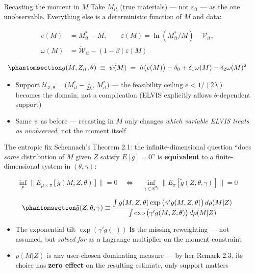 \documentclass[
  ignorenonframetext,
  aspectratio=169,
]{beamer}
\providecommand{\tightlist}{%
  \setlength{\itemsep}{0pt}\setlength{\parskip}{0pt}}
\begin{document}
\begin{frame}{Recasting the moment in \(M\)}
\protect{}\label{recasting-the-moment-in-m}
Take \(M_{it}\) (true materials) --- not \(\varepsilon_{it}\) --- as the
one unobservable. Everything else is a deterministic function of \(M\)
and data:

\[
\begin{aligned}
e(M)&=M^*_{it}-M,\qquad \varepsilon(M)=\ln(M^*_{it}/M)-\mathcal V_{it},\\
\omega(M)&=\tilde{\mathcal W}_{it}-(1-\beta)\varepsilon(M)
\end{aligned}
\]

\begin{equation}\protect\phantomsection\label{eq-elvis-g}{
g(M,Z_{it},\theta)\;\equiv\;\psi(M)\;=\;h\big(e(M)\big)-\delta_0+\delta_1\omega(M)-\delta_2\omega(M)^2
}\end{equation}

\begin{itemize}
\tightlist
\item
  Support
  \(\mathcal U_{Z,\theta}=\big(M^*_{it}-\tfrac1{2\lambda},\,M^*_{it}\big)\)
  --- the feasibility ceiling \(e<1/(2\lambda)\) becomes the domain, not
  a complication (ELVIS explicitly allows \(\theta\)-dependent support)
\item
  Same \(\psi\) as before --- recasting in \(M\) only changes
  \emph{which variable ELVIS treats as unobserved}, not the moment
  itself
\end{itemize}
\end{frame}

\begin{frame}{The entropic fix}
\protect{}\label{the-entropic-fix}
Schennach's Theorem 2.1: the infinite-dimensional question ``does
\emph{some} distribution of \(M\) given \(Z\) satisfy \(E[g]=0\)'' is
\textbf{equivalent} to a finite-dimensional system in
\((\theta,\gamma)\):

\[
\inf_{\mu}\big\|E_{\mu\times\pi}[g(M,Z,\theta)]\big\|=0 \quad\Longleftrightarrow\quad \inf_{\gamma\in\mathbb R^{d_g}}\big\|E_\pi[\tilde g(Z,\theta,\gamma)]\big\|=0
\]

\begin{equation}\protect\phantomsection\label{eq-elvis-tilt}{
\tilde g(Z,\theta,\gamma)\equiv\frac{\int g(M,Z,\theta)\exp\big(\gamma'g(M,Z,\theta)\big)\,d\rho(M|Z)}{\int \exp\big(\gamma'g(M,Z,\theta)\big)\,d\rho(M|Z)}
}\end{equation}

\begin{itemize}
\tightlist
\item
  The exponential tilt \(\exp(\gamma'g(\cdot))\) \textbf{is} the missing
  reweighting --- not assumed, but \emph{solved for} as a Lagrange
  multiplier on the moment constraint
\item
  \(\rho(M|Z)\) is any user-chosen dominating measure --- by her Remark
  2.3, its choice has \textbf{zero effect} on the resulting estimate,
  only support matters
\end{itemize}
\end{frame}
\end{document}
